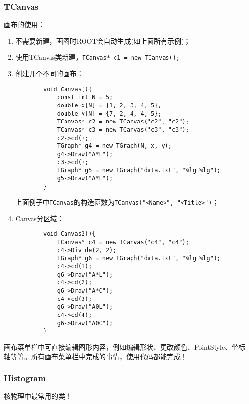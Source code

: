 \documentclass{article}
\begin{document}
\subsubsection{TCanvas}
画布的使用：
\begin{enumerate}
    \item 不需要新建，画图时ROOT会自动生成(如上面所有示例)；
    \item 使用TCanvas类新建，\texttt{TCanvas* c1 = new TCanvas();}
    \item 创建几个不同的画布：
          \begin{lstlisting}
        void Canvas(){
            const int N = 5;
            double x[N] = {1, 2, 3, 4, 5};
            double y[N] = {7, 2, 4, 4, 5};
            TCanvas* c2 = new TCanvas("c2", "c2");
            TCanvas* c3 = new TCanvas("c3", "c3");
            c2->cd();
            TGraph* g4 = new TGraph(N, x, y);
            g4->Draw("A*L");
            c3->cd();
            TGraph* g5 = new TGraph("data.txt", "%lg %lg");
            g5->Draw("A*L");
        }
    \end{lstlisting}
          上面例子中\texttt{TCanvas}的构造函数为\texttt{TCanvas("<Name>", "<Title>")}；
    \item Canvas分区域：
          \begin{lstlisting}
        void Canvas2(){
            TCanvas* c4 = new TCanvas("c4", "c4");
            c4->Divide(2, 2);
            TGraph* g6 = new TGraph("data.txt", "%lg %lg");
            c4->cd(1);
            g6->Draw("A*L");
            c4->cd(2);
            g6->Draw("A*C");
            c4->cd(3);
            g6->Draw("A0L");
            c4->cd(4);
            g6->Draw("A0C");
        }
    \end{lstlisting}
\end{enumerate}

画布菜单栏中可直接编辑图形内容，例如编辑形状、更改颜色、PointStyle、坐标轴等等。所有画布菜单栏中完成的事情，使用代码都能完成！

\subsubsection{Histogram}
核物理中最常用的类！
\end{document}
